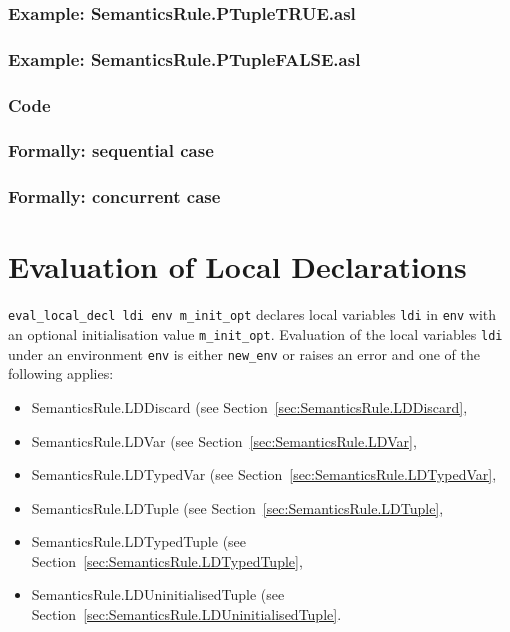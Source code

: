 \documentclass{book}
\begin{document}
    \subsection{Example: SemanticsRule.PTupleTRUE.asl}

    \subsection{Example: SemanticsRule.PTupleFALSE.asl}

  \subsection{Code}

\begin{emptyformal}
  \subsection{Formally: sequential case}

  \subsection{Formally: concurrent case}
\end{emptyformal}


\chapter{Evaluation of Local Declarations \label{chap:eval_local_decl}}

\texttt{eval\_local\_decl ldi env m\_init\_opt} declares local variables
\texttt{ldi} in \texttt{env} with an optional initialisation value
\texttt{m\_init\_opt}.  Evaluation of the local variables \texttt{ldi}
under an environment \texttt{env} is either \texttt{new\_env} or raises an
error and one of the following applies:
\begin{itemize}
\item SemanticsRule.LDDiscard (see Section~\ref{sec:SemanticsRule.LDDiscard},
\item SemanticsRule.LDVar (see Section~\ref{sec:SemanticsRule.LDVar},
\item SemanticsRule.LDTypedVar (see Section~\ref{sec:SemanticsRule.LDTypedVar},
\item SemanticsRule.LDTuple (see Section~\ref{sec:SemanticsRule.LDTuple},
\item SemanticsRule.LDTypedTuple (see Section~\ref{sec:SemanticsRule.LDTypedTuple},
\item SemanticsRule.LDUninitialisedTuple (see Section~\ref{sec:SemanticsRule.LDUninitialisedTuple}.
\end{itemize}
\end{document}
